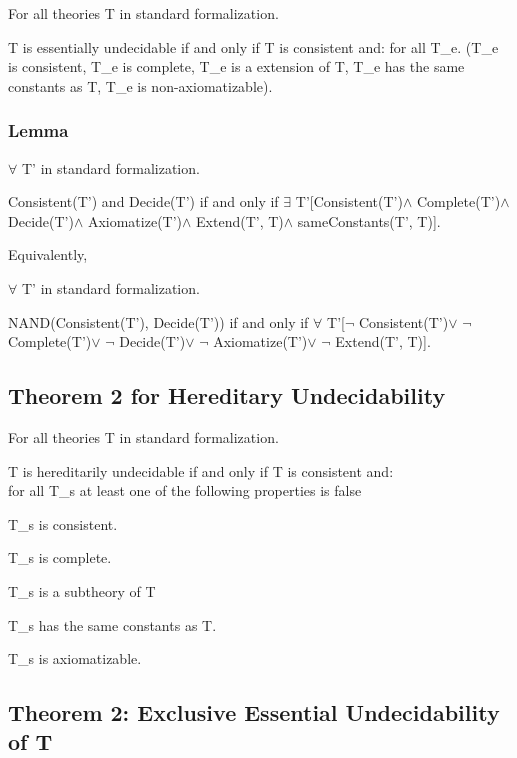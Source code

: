 For all theories T in standard formalization.

T is essentially undecidable if and only if T is consistent and: for all
T\_e. (T\_e is consistent, T\_e is complete, T\_e is a extension of T,
T\_e has the same constants as T, T\_e is non-axiomatizable).

\hypertarget{lemma}{%
\subsubsection{\texorpdfstring{Lemma }{Lemma }}\label{lemma}}

$\forall$ T' in standard formalization.

Consistent(T') and Decide(T') if and only if
$\exists$ T\textquotesingle'{[}Consistent(T'\textquotesingle)$\land$
Complete(T'\textquotesingle)$\land$ Decide(T'\textquotesingle)$\land$ Axiomatize(T\textquotesingle')$\land$ Extend(T',
T\textquotesingle\textquotesingle)$\land$ sameConstants(T',
T\textquotesingle\textquotesingle){]}.

Equivalently,

$\forall$ T' in standard formalization.

NAND(Consistent(T'), Decide(T')) if and only if
$\forall$ T\textquotesingle'{[}$\neg$ Consistent(T'\textquotesingle)$\lor$ $\neg$ Complete(T'\textquotesingle)$\lor$ $\neg$ Decide(T'\textquotesingle)$\lor$ $\neg$ Axiomatize(T\textquotesingle')$\lor$ $\neg$ Extend(T',
T\textquotesingle\textquotesingle){]}.

\hypertarget{theorem-2-for-hereditary-undecidability}{%
\subsection{Theorem 2 for Hereditary
Undecidability}\label{theorem-2-for-hereditary-undecidability}}

For all theories T in standard formalization.

T is hereditarily undecidable if and only if T is consistent and:\\
for all T\_s at least one of the following properties is false

T\_s is consistent.

T\_s is complete.

T\_s is a subtheory of T

T\_s has the same constants as T.

T\_s is axiomatizable.

\hypertarget{theorem-2-exclusive-essential-undecidability-of-t}{%
\subsection{Theorem 2: Exclusive Essential Undecidability of
T}\label{theorem-2-exclusive-essential-undecidability-of-t}}

